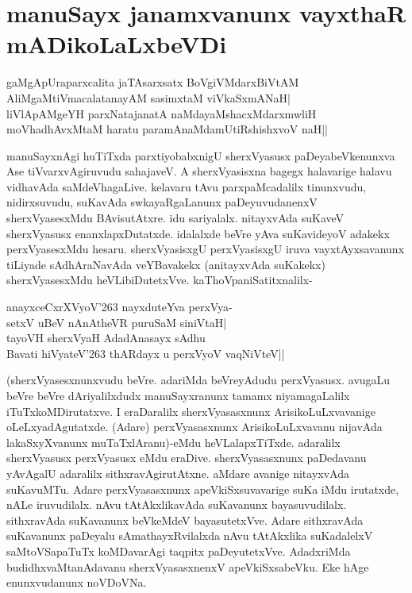 \chapter{manuSayx janamxvanunx vayxthaR mADikoLaLxbeVDi}\label{chap6}

\begin{shloka}
gaMgApUraparxcalita jaTAsarxsatx BoVgiVMdarxBiVtAM\\
AliMgaMtiVmacalatanayAM sasimxtaM viVkaSxmANaH|\\
liVlApAMgeYH parxNatajanatA naMdayaMshacxMdarxmwliH\\
moVhadhAvxMtaM haratu paramAnaMdamUtiRshishxvoV naH||
\end{shloka}

manuSayxnAgi huTiTxda parxtiyobabxnigU sherxVyasusx paDeyabeVkenunxva Ase tiVvarxvAgiruvudu sahajaveV. A sherxVyasisxna bagegx halavarige halavu vidhavAda saMdeVhagaLive. kelavaru tAvu parxpaMcadalilx tinunxvudu, nidirxsuvudu, suKavAda swkayaRgaLanunx paDeyuvudanenxV sherxVyasesxMdu BAvisutAtxre. idu sariyalalx. nitayxvAda suKaveV sherxVyasusx enanxlapxDutatxde. idalalxde beVre yAva suKavideyoV adakekx perxVyasesxMdu hesaru. sherxVyasisxgU perxVyasisxgU iruva vayxtAyxsavanunx tiLiyade sAdhAraNavAda veYBavakekx (anitayxvAda suKakekx) sherxVyasesxMdu heVLibiDutetxVve. kaThoVpaniSatitxnalilx-

\begin{shloka}
anayxceCxrXVyoV\char'263 nayxduteYva perxVya-\\
setxV uBeV nAnAtheVR puruSaM siniVtaH|\\
tayoVH sherxVyaH AdadAnasayx sAdhu\\
Bavati hiVyateV\char'263 thARdayx u perxVyoV vaqNiVteV||
\end{shloka}

(sherxVyasesxnunxvudu beVre. adariMda beVreyAdudu perxVyasusx. avugaLu beVre beVre dAriyalilxdudx manuSayxranunx tamamx niyamagaLalilx iTuTxkoMDirutatxve. I eraDaralilx sherxVyasasxnunx ArisikoLuLxvavanige oLeLxyadAgutatxde. (Adare) perxVyasasxnunx ArisikoLuLxvavanu nijavAda lakaSxyXvanunx muTaTxlAranu)-eMdu heVLalapxTiTxde. adaralilx sherxVyasusx perxVyasusx eMdu eraDive. sherxVyasasxnunx paDedavanu yAvAgalU adaralilx sithxravAgirutAtxne. aMdare avanige nitayxvAda suKavuMTu. Adare perxVyasasxnunx apeVkiSxsuvavarige suKa iMdu irutatxde, nALe iruvudilalx. nAvu tAtAkxlikavAda suKavanunx bayasuvudilalx. sithxravAda suKavanunx beVkeMdeV bayasutetxVve. Adare sithxravAda suKavanunx paDeyalu sAmathayxRvilalxda nAvu tAtAkxlika suKadalelxV saMtoVSapaTuTx koMDavarAgi taqpitx paDeyutetxVve. AdadxriMda budidhxvaMtanAdavanu sherxVyasasxnenxV apeVkiSxsabeVku. Eke hAge enunxvudanunx noVDoVNa.

